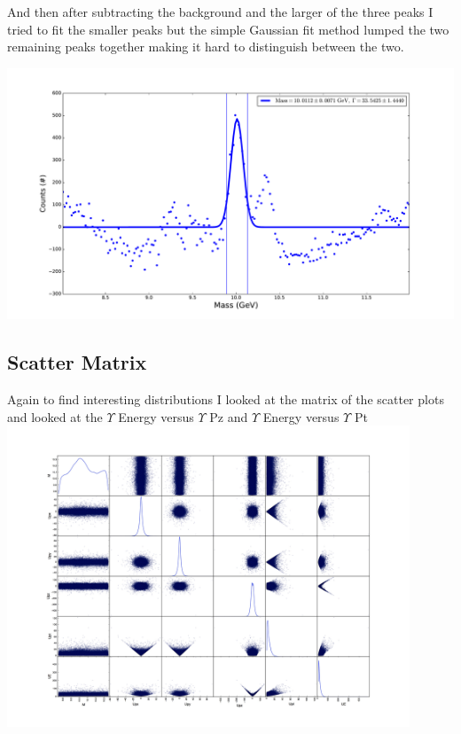 \documentclass[a4paper, 11pt]{article}
\begin{document}
And then after subtracting the background and the larger of the three peaks I tried to fit the smaller peaks but the simple Gaussian fit method lumped the two remaining peaks together making it hard to distinguish between the two.

\includegraphics[width=\textwidth]{Upsilon/Up_peak.pdf} \\

\subsection*{Scatter Matrix}
Again to find interesting distributions I looked at the matrix of the scatter plots and looked at the  $\Upsilon$ Energy versus $\Upsilon$ Pz and $\Upsilon$ Energy versus $\Upsilon$ Pt \\
\includegraphics[width=0.9\textwidth]{Upsilon/scatter_matrix.jpg} \\
\end{document}
